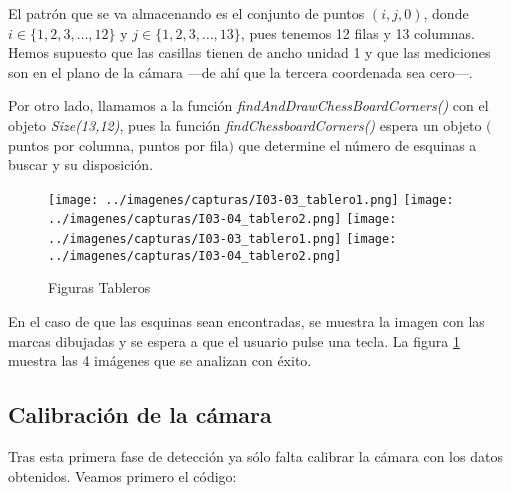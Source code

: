\documentclass[a4paper, 11pt]{article}
\theoremstyle{definition}
\theoremstyle{theorem}
\begin{document}
    El patrón que se va almacenando es el conjunto de puntos $(i,j,0)$, donde $i\in\{1,2,3,\dots,12\}$ y $j\in\{1,2,3,\dots,13\}$, pues tenemos 12 filas y 13 columnas. Hemos supuesto que las casillas tienen de ancho unidad 1 y que las mediciones son en el plano de la cámara ---de ahí que la tercera coordenada sea cero---.

    Por otro lado, llamamos a la función \emph{findAndDrawChessBoardCorners()} con el objeto \emph{Size(13,12)}, pues la función  \emph{findChessboardCorners()} espera un objeto $($puntos por columna, puntos por fila$)$ que determine el número de esquinas a buscar y su disposición.

    \begin{figure}[!htb]
        \texttt{[image: ../imagenes/capturas/I03-03\_tablero1.png]}
        \endminipage\hfill
        \texttt{[image: ../imagenes/capturas/I03-04\_tablero2.png]}
        \endminipage\vfill\vfill
        \texttt{[image: ../imagenes/capturas/I03-03\_tablero1.png]}
        \endminipage\hfill
        \texttt{[image: ../imagenes/capturas/I03-04\_tablero2.png]}
        \endminipage
        \caption{Figuras Tableros}\label{fig:tableros}
    \end{figure}

    En el caso de que las esquinas sean encontradas, se muestra la imagen con las marcas dibujadas y se espera a que el usuario pulse una tecla. La figura \ref{fig:tableros} muestra las 4 imágenes que se analizan con éxito.

    \subsection{Calibración de la cámara}

    Tras esta primera fase de detección ya sólo falta calibrar la cámara con los datos obtenidos. Veamos primero el código:
\end{document}

